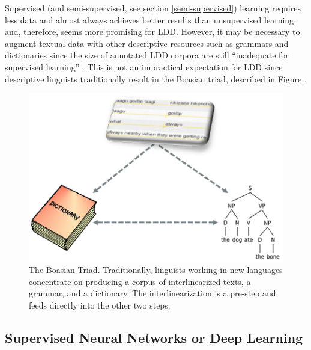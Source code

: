 \documentclass[12pt]{article}
\begin{document}
Supervised (and semi-supervised, see section \ref{semi-supervised}) learning requires less data and almost always achieves better results than unsupervised learning \cite{ruokolainen_supervised_2013} and, therefore, seems more promising for LDD. However, it may be necessary to augment textual data with other descriptive resources such as grammars and dictionaries since the size of annotated LDD corpora are still ``inadequate for supervised learning'' \cite[page 18]{duong_natural_2017}. This is not an impractical expectation for LDD since descriptive linguists traditionally result in the Boasian triad, described in Figure .

\begin{figure}[ht]
\label{fig:Triad}
\begin{center}
\includegraphics[width=0.7\columnwidth]{Triad.PNG}
\caption{The Boasian Triad. Traditionally, linguists working in new languages concentrate on producing a corpus of interlinearized texts, a grammar, and a dictionary. The interlinearization is a pre-step and feeds directly into the other two steps.}
\end{center}
\end{figure}

\subsection{Supervised Neural Networks or Deep Learning}
\end{document}
